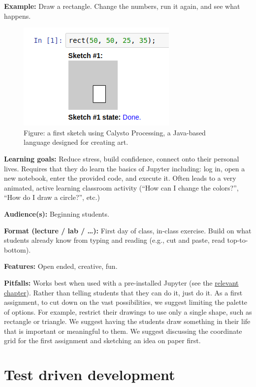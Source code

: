 \documentclass[]{book}
\begin{document}
\textbf{Example:} Draw a rectangle. Change the numbers, run it again,
and see what happens.

\begin{figure}
\centering
\includegraphics{images/processing.png}
\caption{Figure: a first sketch using Calysto Processing, a Java-based
language designed for creating art.}
\end{figure}

\textbf{Learning goals:} Reduce stress, build confidence, connect onto
their personal lives. Requires that they do learn the basics of Jupyter
including: log in, open a new notebook, enter the provided code, and
execute it. Often leads to a very animated, active learning classroom
activity (``How can I change the colors?'', ``How do I draw a circle?'',
etc.)

\textbf{Audience(s):} Beginning students.

\textbf{Format (lecture / lab / \ldots{}):} First day of class, in-class
exercise. Build on what students already know from typing and reading
(e.g., cut and paste, read top-to-bottom).

\textbf{Features:} Open ended, creative, fun.

\textbf{Pitfalls:} Works best when used with a pre-installed Jupyter
(see the \protect\hyperlink{jupyter}{relevant chapter}). Rather than
telling students that they can do it, just do it. As a first assignment,
to cut down on the vast possibilities, we suggest limiting the palette
of options. For example, restrict their drawings to use only a single
shape, such as rectangle or triangle. We suggest having the students
draw something in their life that is important or meaningful to them. We
suggest discussing the coordinate grid for the first assignment and
sketching an idea on paper first.

\section{Test driven development}\label{test-driven-development}
\end{document}
